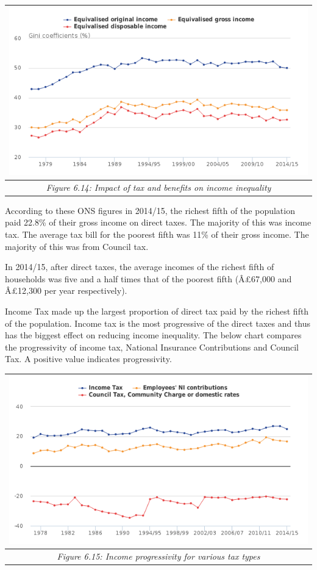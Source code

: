 \documentclass[]{tufte-handout}
\begin{document}
\begin{longtable}[]{@{}c@{}}
\toprule
\includegraphics{ChapterPictures/6-13-ImpactTBIneq.png}\tabularnewline
\midrule
\endhead
\emph{Figure 6.14: Impact of tax and benefits on income
inequality}\tabularnewline
\bottomrule
\end{longtable}

According to these ONS figures in 2014/15, the richest fifth of the
population paid 22.8\% of their gross income on direct taxes. The
majority of this was income tax. The average tax bill for the poorest
fifth was 11\% of their gross income. The majority of this was from
Council tax.

In 2014/15, after direct taxes, the average incomes of the richest fifth
of households was five and a half times that of the poorest fifth
(Â£67,000 and Â£12,300 per year respectively).

Income Tax made up the largest proportion of direct tax paid by the
richest fifth of the population. Income tax is the most progressive of
the direct taxes and thus has the biggest effect on reducing income
inequality. The below chart compares the progressivity of income tax,
National Insurance Contributions and Council Tax. A positive value
indicates progressivity.

\begin{longtable}[]{@{}c@{}}
\toprule
\includegraphics{ChapterPictures/6-14-IncomeProgressivityTax.png}\tabularnewline
\midrule
\endhead
\emph{Figure 6.15: Income progressivity for various tax
types}\tabularnewline
\bottomrule
\end{longtable}
\end{document}
